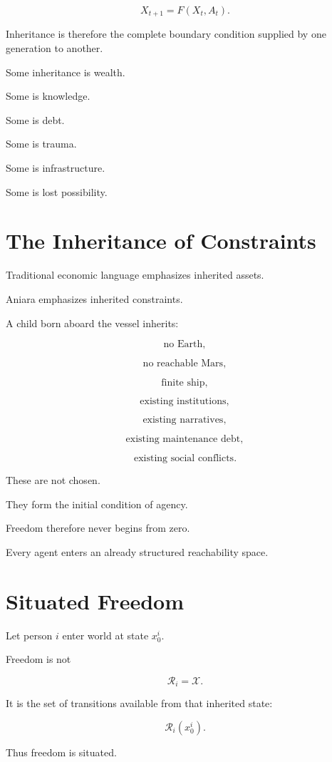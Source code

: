 \documentclass[11pt,oneside]{book}
\theoremstyle{definition}
\theoremstyle{remark}
\newcommand{\R}{\mathcal{R}}
\begin{document}
\[
X_{t+1}
=
F(X_t,A_t).
\]

Inheritance is therefore the complete boundary condition supplied by one generation to another.

Some inheritance is wealth.

Some is knowledge.

Some is debt.

Some is trauma.

Some is infrastructure.

Some is lost possibility.

\section{The Inheritance of Constraints}

Traditional economic language emphasizes inherited assets.

Aniara emphasizes inherited constraints.

A child born aboard the vessel inherits:

\[
\text{no Earth},
\]

\[
\text{no reachable Mars},
\]

\[
\text{finite ship},
\]

\[
\text{existing institutions},
\]

\[
\text{existing narratives},
\]

\[
\text{existing maintenance debt},
\]

\[
\text{existing social conflicts}.
\]

These are not chosen.

They form the initial condition of agency.

Freedom therefore never begins from zero.

Every agent enters an already structured reachability space.

\section{Situated Freedom}

Let person \(i\) enter world at state \(x_0^i\).

Freedom is not

\[
\R_i=\mathcal X.
\]

It is the set of transitions available from that inherited state:

\[
\R_i(x_0^i).
\]

Thus freedom is situated.
\end{document}
